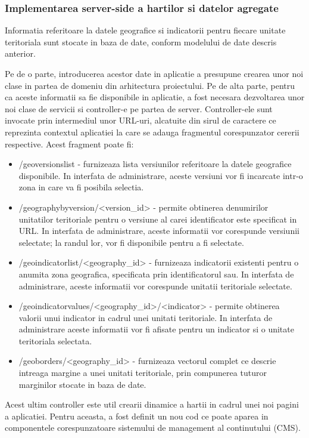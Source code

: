 \documentclass[a4paper, 10pt]{article}
\begin{document}
{\subsubsection{Implementarea server-side a hartilor si datelor agregate}

Informatia referitoare la datele geografice si indicatorii pentru fiecare unitate teritoriala sunt stocate in baza de date, conform modelului de date descris anterior. 

Pe de o parte, introducerea acestor date in aplicatie a presupune crearea unor noi clase in partea de domeniu din arhitectura proiectului. 
Pe de alta parte, pentru ca aceste informatii sa fie disponibile in aplicatie, a fost necesara dezvoltarea unor noi clase de servicii si controller-e pe partea de server. 
Controller-ele sunt invocate prin intermediul unor URL-uri, 
alcatuite din sirul de caractere ce reprezinta contextul aplicatiei la care se adauga fragmentul corespunzator cererii respective. 
Acest fragment poate fi:
\begin{itemize}
\item
/geoversionslist - furnizeaza lista versiunilor referitoare la datele geografice disponibile. In interfata de administrare, aceste versiuni vor fi incarcate intr-o zona in care va fi posibila selectia.
\item
/geographybyversion/<version\_id> - permite obtinerea denumirilor unitatilor teritoriale pentru o versiune al carei identificator este specificat in URL. In interfata de administrare, aceste informatii vor corespunde versiunii selectate; la randul lor, vor fi disponibile pentru a fi selectate. 
\item
/geoindicatorlist/<geography\_id> - furnizeaza indicatorii existenti pentru o anumita zona geografica, specificata prin identificatorul sau. In interfata de administrare, aceste informatii vor corespunde unitatii teritoriale selectate.
\item
/geoindicatorvalues/<geography\_id>/<indicator> - permite obtinerea valorii unui indicator in cadrul unei unitati teritoriale. In interfata de administrare aceste informatii vor fi afisate pentru un indicator si o unitate teritoriala selectata.
\item
/geoborders/<geography\_id> - furnizeaza vectorul complet ce descrie intreaga margine a unei unitati teritoriale, prin compunerea tuturor marginilor stocate in baza de date. 
\end{itemize}
Acest ultim controller este util crearii dinamice a hartii in cadrul unei noi pagini a aplicatiei. Pentru aceasta, a fost definit un nou cod ce poate aparea in componentele corespunzatoare sistemului de management al continutului (CMS). 

}
\end{document}
